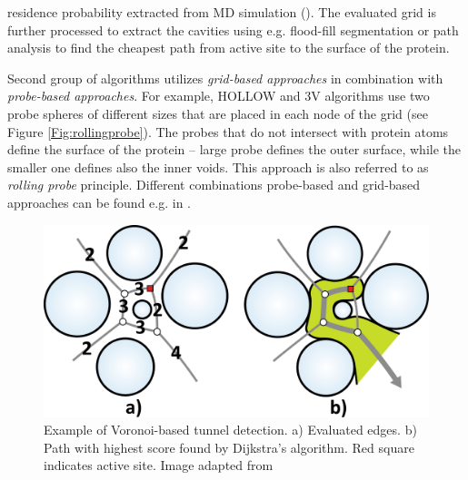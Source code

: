 residence probability extracted from MD simulation (\cite{raunest2011dxtuber, krone2011interactive, kokh2013trapp, paramo2014efficient}). The evaluated grid is further processed to extract the cavities using e.g. flood-fill segmentation or path analysis to find the cheapest path from active site to the surface of the protein.

Second group of algorithms utilizes \textit{grid-based approaches} in combination with  \textit{probe-based approaches}. For example, HOLLOW \cite{Ho2008Hollow} and 3V \cite{voss20103v} algorithms use two probe spheres of different sizes that are placed in each node of the grid (see Figure \ref{Fig:rollingprobe}). The probes that do not intersect with protein atoms define the surface of the protein -- large probe defines the outer surface, while the smaller one defines also the inner voids. This approach is also referred to as \textit{rolling probe} principle. Different combinations probe-based and grid-based approaches can be found e.g. in \cite{kleywegt1994detection, czirjak2015princces, laskowski1995surfnet, yu2009roll}.

\begin{figure}
\vspace{-17pt}
   \begin{center}
  \includegraphics[width=\linewidth]{pictures/voronoi.pdf} 
  \caption{Example of Voronoi-based tunnel detection. a) Evaluated edges. b) Path with highest score found by Dijkstra's algorithm. Red square indicates active site. Image adapted from~ \cite{caver20}}
  \label{Fig:voronoi} 
   \end{center} 
   \vspace{-17pt}
\end{figure} 

